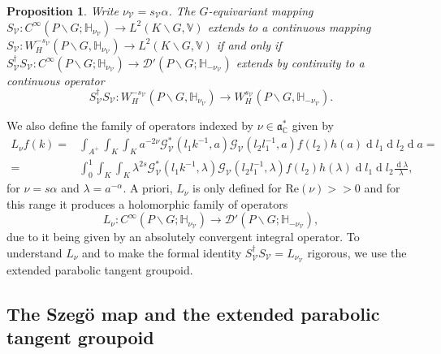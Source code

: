 \documentclass[a4paper,reqno]{amsart}
\numberwithin{equation}{section}
\def\rd{\operatorname{d}\!}
\def\C{\mathbb{C}}
\newtheorem{prop}[thm]{Proposition}
\theoremstyle{definition}
\theoremstyle{remark}
\begin{document}
\begin{prop}
\label{stararsta}
Write $\nu_{\mathcal{V}}=s_{\mathcal{V}}\alpha$. The $G$-equivariant mapping $S_{\mathcal{V}}:C^\infty(P\backslash G;\mathbb{H}_{\nu_{\mathcal{V}}})\to L^2(K\backslash G,\mathbb{V})$ extends to a continuous mapping $S_{\mathcal{V}}:W^{-s_\mathcal{V}}_H(P\backslash G,\mathbb{H}_{\nu_\mathcal{V}})\to L^2(K\backslash G,\mathbb{V})$ if and only if $S_{\mathcal{V}}^\dagger  S_{\mathcal{V}}:C^\infty(P\backslash G;\mathbb{H}_{\nu_{\mathcal{V}}})\to \mathcal{D}'(P\backslash G;\mathbb{H}_{-\nu_{\mathcal{V}}})$ extends by continuity to a continuous operator 
$$S_{\mathcal{V}}^\dagger  S_{\mathcal{V}}:W^{-s_\mathcal{V}}_H(P\backslash G,\mathbb{H}_{\nu_\mathcal{V}})\to W^{s_\mathcal{V}}_H(P\backslash G,\mathbb{H}_{-\nu_\mathcal{V}}).$$
\end{prop} 



We also define the family of operators indexed by $\nu\in \mathfrak{a}_\C^*$ given by
\begin{align}
\label{lnueq}
L_{\nu}f(k)=&\int_{A^+}\int_{K}\int_K a^{-2\nu}  \mathcal{G}_{\mathcal{V}}^*(l_1k^{-1},a)\mathcal{G}_{\mathcal{V}}(l_2l_1^{-1},a)f(l_2)h(a)\rd l_1\rd l_2\rd a=\\
=&\int_{0}^1\int_{K}\int_K \lambda^{2s}  \mathcal{G}_{\mathcal{V}}^*(l_1k^{-1},\lambda)\mathcal{G}_{\mathcal{V}}(l_2l_1^{-1},\lambda)f(l_2)h(\lambda)\rd l_1\rd l_2\frac{\rd \lambda}{\lambda},
\end{align}
for $\nu=s\alpha$ and $\lambda=a^{-\alpha}$. A priori, $L_\nu$ is only defined for $\mathrm{Re}(\nu)>>0$ and for this range it produces a holomorphic family of operators 
$$
L_{\nu}:C^\infty(P\backslash G;\mathbb{H}_{\nu_{\mathcal{V}}})\to \mathcal{D}'(P\backslash G;\mathbb{H}_{-\nu_{\mathcal{V}}}),
$$
due to it being given by an absolutely convergent integral operator. To understand $L_\nu$ and to make the formal identity $S_{\mathcal{V}}^\dagger  S_{\mathcal{V}}=L_{\nu_{\mathcal{V}}}$ rigorous, we use the extended parabolic tangent groupoid.







\subsection{The Szegö map and the extended parabolic tangent groupoid}
\label{boundviaext}
\end{document}
